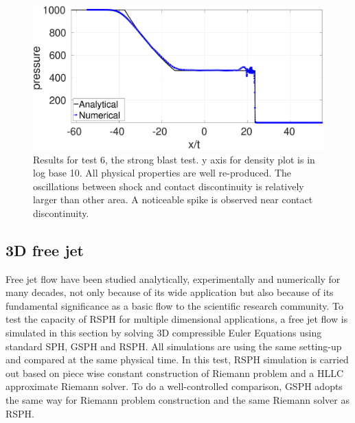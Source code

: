 \documentclass[review]{elsarticle}
\begin{document}
\begin{figure}[htp]
\begin{minipage}{.495 \textwidth}
    \end{minipage}%
    \begin{minipage}{.495 \textwidth}
        \centering
        \includegraphics[width=0.99 \textwidth]{./Figures/strong-blast/StrBlst-RCM-p-Rp3}
    \end{minipage}%
    \caption{Results for test 6, the strong blast test. y axis for density plot is in log base 10. All physical properties are well re-produced. The oscillations between shock and contact discontinuity is relatively larger than other area. A noticeable spike is observed near contact discontinuity.}
    \label{fig:RCM-strong-blast}
\end{figure}

\subsection{3D free jet}
Free jet flow have been studied analytically, experimentally and numerically for many decades, not only because of its wide application but also because of its fundamental significance as a basic flow to the scientific research community. To test the capacity of RSPH for multiple dimensional applications, a free jet flow is simulated in this section by solving 3D compressible Euler Equations using standard SPH, GSPH and RSPH. 
All simulations are using the same setting-up and compared at the same physical time. In this test, RSPH simulation is carried out based on piece wise constant construction of Riemann problem and a HLLC approximate Riemann solver. To do a well-controlled comparison, GSPH adopts the same way for Riemann problem construction and the same Riemann solver as RSPH. 
\end{document}
